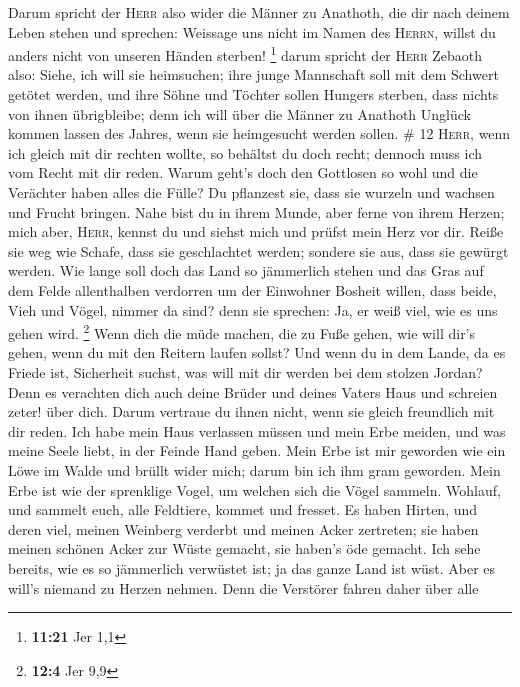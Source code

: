  Darum spricht der \textsc{Herr} also wider die Männer zu
Anathoth, die dir nach deinem Leben stehen und sprechen: Weissage uns
nicht im Namen des \textsc{Herrn}, willst du anders nicht von unseren
Händen sterben! \footnote{\textbf{11:21} Jer 1,1}  darum
spricht der \textsc{Herr} Zebaoth also: Siehe, ich will sie heimsuchen;
ihre junge Mannschaft soll mit dem Schwert getötet werden, und ihre
Söhne und Töchter sollen Hungers sterben, dass nichts von ihnen
übrigbleibe;  denn ich will über die Männer zu Anathoth
Unglück kommen lassen des Jahres, wenn sie heimgesucht werden sollen. \#
12  \textsc{Herr}, wenn ich gleich mit dir rechten wollte,
so behältst du doch recht; dennoch muss ich vom Recht mit dir reden.
Warum geht's doch den Gottlosen so wohl und die Verächter haben alles
die Fülle?  Du pflanzest sie, dass sie wurzeln und wachsen
und Frucht bringen. Nahe bist du in ihrem Munde, aber ferne von ihrem
Herzen;  mich aber, \textsc{Herr}, kennst du und siehst
mich und prüfst mein Herz vor dir. Reiße sie weg wie Schafe, dass sie
geschlachtet werden; sondere sie aus, dass sie gewürgt werden.
 Wie lange soll doch das Land so jämmerlich stehen und das
Gras auf dem Felde allenthalben verdorren um der Einwohner Bosheit
willen, dass beide, Vieh und Vögel, nimmer da sind? denn sie sprechen:
Ja, er weiß viel, wie es uns gehen wird. \footnote{\textbf{12:4} Jer 9,9}
 Wenn dich die müde machen, die zu Fuße gehen, wie will
dir's gehen, wenn du mit den Reitern laufen sollst? Und wenn du in dem
Lande, da es Friede ist, Sicherheit suchst, was will mit dir werden bei
dem stolzen Jordan?  Denn es verachten dich auch deine
Brüder und deines Vaters Haus und schreien zeter! über dich. Darum
vertraue du ihnen nicht, wenn sie gleich freundlich mit dir reden.
 Ich habe mein Haus verlassen müssen und mein Erbe meiden,
und was meine Seele liebt, in der Feinde Hand geben.  Mein
Erbe ist mir geworden wie ein Löwe im Walde und brüllt wider mich; darum
bin ich ihm gram geworden.  Mein Erbe ist wie der
sprenklige Vogel, um welchen sich die Vögel sammeln. Wohlauf, und
sammelt euch, alle Feldtiere, kommet und fresset.  Es
haben Hirten, und deren viel, meinen Weinberg verderbt und meinen Acker
zertreten; sie haben meinen schönen Acker zur Wüste gemacht, sie haben's
öde gemacht.  Ich sehe bereits, wie es so jämmerlich
verwüstet ist; ja das ganze Land ist wüst. Aber es will's niemand zu
Herzen nehmen.  Denn die Verstörer fahren daher über alle
